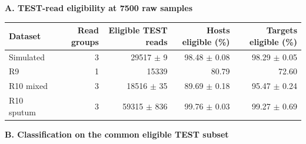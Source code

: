 \textbf{A. TEST-read eligibility at 7500 raw samples}\par\smallskip
\begin{tabular}{@{}lrrrr@{}}\toprule
Dataset & Read groups & Eligible TEST reads & Hosts eligible (\%) & Targets eligible (\%)\\\midrule
Simulated & 3 & 29517 $\pm$ 9 & 98.48 $\pm$ 0.08 & 98.29 $\pm$ 0.05\\
R9 & 1 & 15339 & 80.79 & 72.60\\
R10 mixed & 3 & 18516 $\pm$ 35 & 89.69 $\pm$ 0.18 & 95.47 $\pm$ 0.24\\
R10 sputum & 3 & 59315 $\pm$ 836 & 99.76 $\pm$ 0.03 & 99.27 $\pm$ 0.69\\
\bottomrule\end{tabular}
\par\medskip
\textbf{B. Classification on the common eligible TEST subset}\par\smallskip
